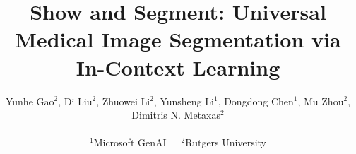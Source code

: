 \documentclass[10pt,twocolumn,letterpaper]{article}
\title{Show and Segment: Universal Medical Image Segmentation via In-Context Learning}
\author{Yunhe Gao$^{2}$, Di Liu$^{2}$, Zhuowei Li$^{2}$, Yunsheng Li$^{1}$, Dongdong Chen$^{1}$, Mu Zhou$^{2}$, Dimitris N. Metaxas$^{2}$\\\\
$^1$Microsoft GenAI~~~$^2$Rutgers University\vspace{-0em}
}
\begin{document}
\maketitle
    






{
    \small
    
    
}


\end{document}
